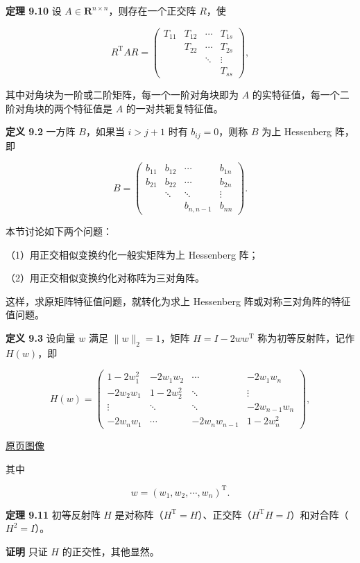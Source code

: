 \documentclass[
  10pt,
  fontset=fandol]{ctexart}
\begin{document}
\textbf{定理 9.10} 设 \(A\in\mathbf R^{n\times n}\)，则存在一个正交阵 \(R\)，使

\[
R^{\mathrm T}AR=\begin{pmatrix}
T_{11}&T_{12}&\cdots&T_{1s}\\
&T_{22}&\cdots&T_{2s}\\
&&\ddots&\vdots\\
&&&T_{ss}
\end{pmatrix},
\]

其中对角块为一阶或二阶矩阵，每一个一阶对角块即为 \(A\) 的实特征值，每一个二阶对角块的两个特征值是 \(A\) 的一对共轭复特征值。

\textbf{定义 9.2} 一方阵 \(B\)，如果当 \(i>j+1\) 时有 \(b_{ij}=0\)，则称 \(B\) 为上 Hessenberg 阵，即

\[
B=\begin{pmatrix}
b_{11}&b_{12}&\cdots&b_{1n}\\
b_{21}&b_{22}&\cdots&b_{2n}\\
&\ddots&\ddots&\vdots\\
&&b_{n,n-1}&b_{nn}
\end{pmatrix}.
\]

本节讨论如下两个问题：

（1）用正交相似变换约化一般实矩阵为上 Hessenberg 阵；

（2）用正交相似变换约化对称阵为三对角阵。

这样，求原矩阵特征值问题，就转化为求上 Hessenberg 阵或对称三对角阵的特征值问题。

\textbf{定义 9.3} 设向量 \(w\) 满足 \(\|w\|_2=1\)，矩阵 \(H=I-2ww^{\mathrm T}\) 称为初等反射阵，记作 \(H(w)\)，即

\[
H(w)=\begin{pmatrix}
1-2w_1^2&-2w_1w_2&\cdots&-2w_1w_n\\
-2w_2w_1&1-2w_2^2&\ddots&\vdots\\
\vdots&\ddots&\ddots&-2w_{n-1}w_n\\
-2w_nw_1&\cdots&-2w_nw_{n-1}&1-2w_n^2
\end{pmatrix},
\]

\href{../../source-images/pdf-244.jpeg}{原页图像}

其中

\[
w=(w_1,w_2,\cdots,w_n)^{\mathrm T}.
\]

\textbf{定理 9.11} 初等反射阵 \(H\) 是对称阵（\(H^{\mathrm T}=H\)）、正交阵（\(H^{\mathrm T}H=I\)）和对合阵（\(H^2=I\)）。

\textbf{证明} 只证 \(H\) 的正交性，其他显然。
\end{document}

